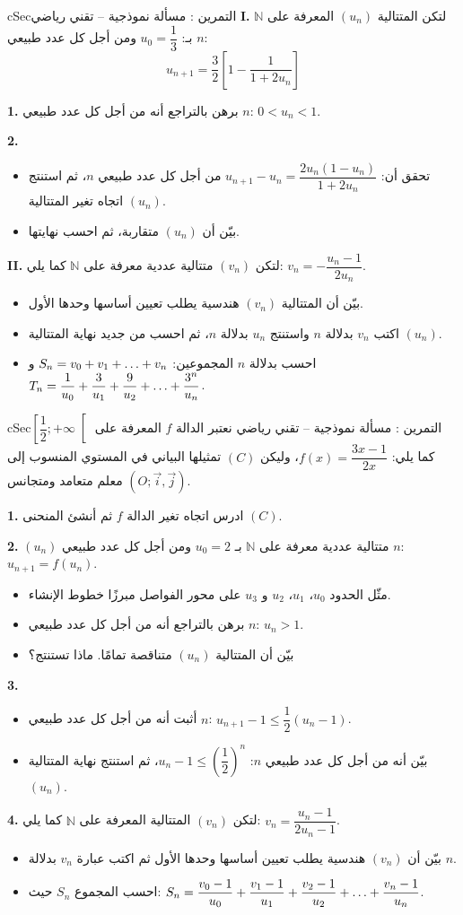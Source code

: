 \documentclass[12pt,a4paper]{article}
\newenvironment{BOX}[2]{\begin{otherlanguage}{english}\begin{arbox}{#1}{#2}}{\end{arbox}\end{otherlanguage}}
\newcounter{exo}
\newenvironment{tamrin}[1]{\stepcounter{exo}\begin{BOX}{cSec}{التمرين \theexo: #1}}{\end{BOX}}
\renewcommand{\dots}{\mathinner{\ldotp\ldotp\ldotp}}
\newcommand{\N}{\mathbb{N}}
\newenvironment{sq}{\begin{itemize}[leftmargin=2.4em,itemsep=3pt]}{\end{itemize}}
\newcommand{\qa}{\item[(أ)]}\newcommand{\qb}{\item[(ب)]}\newcommand{\qc}{\item[(جـ)]}\newcommand{\qd}{\item[(د)]}\newcommand{\qe}{\item[(هـ)]}
\newcommand{\QQ}[1]{\par\smallskip\textbf{#1.} }
\begin{document}
\begin{tamrin}{مسألة نموذجية -- تقني رياضي}
\textbf{I.} لتكن المتتالية $(u_n)$ المعرفة على $\N$ بـ: $u_0=\dfrac13$ ومن أجل كل عدد طبيعي $n$:
\[u_{n+1}=\frac32\left[1-\frac{1}{1+2u_n}\right]\]
\QQ{1} برهن بالتراجع أنه من أجل كل عدد طبيعي $n$: $0<u_n<1$.

\QQ{2}
\begin{sq}
\qa تحقق أن: $u_{n+1}-u_n=\dfrac{2u_n(1-u_n)}{1+2u_n}$ من أجل كل عدد طبيعي $n$، ثم استنتج اتجاه تغير المتتالية $(u_n)$.
\qb بيّن أن $(u_n)$ متقاربة، ثم احسب نهايتها.
\end{sq}
\textbf{II.} لتكن $(v_n)$ متتالية عددية معرفة على $\N$ كما يلي: $v_n=-\dfrac{u_n-1}{2u_n}$.
\begin{sq}
\qa بيّن أن المتتالية $(v_n)$ هندسية يطلب تعيين أساسها وحدها الأول.
\qb اكتب $v_n$ بدلالة $n$ واستنتج $u_n$ بدلالة $n$، ثم احسب من جديد نهاية المتتالية $(u_n)$.
\qc احسب بدلالة $n$ المجموعين: $S_n=v_0+v_1+\dots+v_n$ و $T_n=\dfrac{1}{u_0}+\dfrac{3}{u_1}+\dfrac{9}{u_2}+\dots+\dfrac{3^n}{u_n}$.
\end{sq}
\end{tamrin}

\begin{tamrin}{مسألة نموذجية -- تقني رياضي}
نعتبر الدالة $f$ المعرفة على $\left[\dfrac12;+\infty\right[$ كما يلي: $f(x)=\dfrac{3x-1}{2x}$، وليكن $(C)$ تمثيلها البياني في المستوي المنسوب إلى معلم متعامد ومتجانس $(O;\vec i,\vec j)$.

\QQ{1} ادرس اتجاه تغير الدالة $f$ ثم أنشئ المنحنى $(C)$.

\QQ{2} $(u_n)$ متتالية عددية معرفة على $\N$ بـ $u_0=2$ ومن أجل كل عدد طبيعي $n$: $u_{n+1}=f(u_n)$.
\begin{sq}
\qa مثّل الحدود $u_0$، $u_1$، $u_2$ و $u_3$ على محور الفواصل مبرزًا خطوط الإنشاء.
\qb برهن بالتراجع أنه من أجل كل عدد طبيعي $n$: $u_n>1$.
\qc بيّن أن المتتالية $(u_n)$ متناقصة تمامًا. ماذا تستنتج؟
\end{sq}
\QQ{3}
\begin{sq}
\qa أثبت أنه من أجل كل عدد طبيعي $n$: $u_{n+1}-1\le\dfrac12(u_n-1)$.
\qb بيّن أنه من أجل كل عدد طبيعي $n$: $u_n-1\le\left(\dfrac12\right)^n$، ثم استنتج نهاية المتتالية $(u_n)$.
\end{sq}
\QQ{4} لتكن $(v_n)$ المتتالية المعرفة على $\N$ كما يلي: $v_n=\dfrac{u_n-1}{2u_n-1}$.
\begin{sq}
\qa بيّن أن $(v_n)$ هندسية يطلب تعيين أساسها وحدها الأول ثم اكتب عبارة $v_n$ بدلالة $n$.
\qb احسب المجموع $S_n$ حيث: $S_n=\dfrac{v_0-1}{u_0}+\dfrac{v_1-1}{u_1}+\dfrac{v_2-1}{u_2}+\dots+\dfrac{v_n-1}{u_n}$.
\end{sq}
\end{tamrin}
\end{document}
